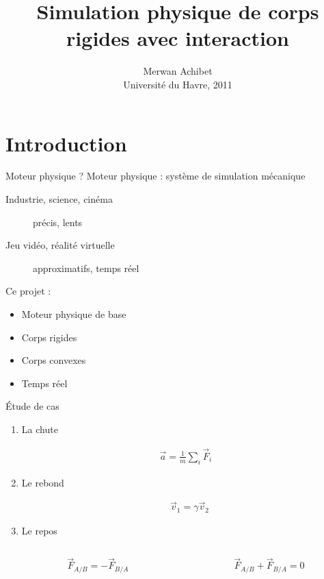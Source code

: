 \documentclass{beamer}
\title{Simulation physique de corps rigides avec interaction}
\author{Merwan Achibet\\ Université du Havre, 2011}
\date{}
\begin{document}
\shorthandoff{!} %

\begin{frame}
  \maketitle
\end{frame}

\section{Introduction}

\begin{frame}{Moteur physique ?}
  Moteur physique : système de simulation mécanique
  \begin{description}
  \item[Industrie, science, cinéma] précis, lents
  \item[Jeu vidéo, réalité virtuelle] approximatifs, temps réel
  \end{description}

  \vfill
  
  Ce projet :
  \begin{itemize}
  \item Moteur physique de base 
  \item Corps rigides
  \item Corps convexes
  \item Temps réel
  \end{itemize}
\end{frame}

\begin{frame}{\'Etude de cas}
  \begin{enumerate}
  \item
    La chute

    \begin{align*}
      \vec{a} = \frac{1}{m} \sum_i \vec{F}_i
    \end{align*}
  \item
    Le rebond

    \begin{align*}
      &\vec{v}_1 = \gamma \vec{v}_2
    \end{align*}
  \item
    Le repos

    \begin{columns}
      \begin{column}{3cm}
        \[\vec{F}_{A/B} = -\vec{F}_{B/A}\]
      \end{column}
      \begin{column}{3cm}
        \[\vec{F}_{A/B} + \vec{F}_{B/A} = 0\]
      \end{column}
    \end{columns}
  \end{enumerate}
\end{frame}
\end{document}
